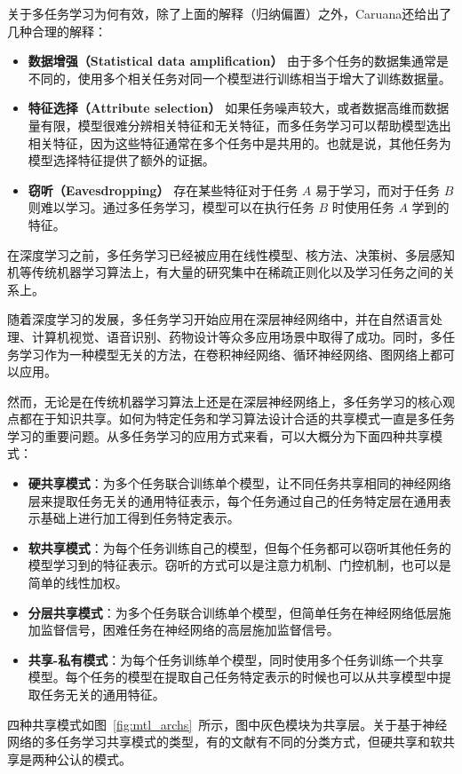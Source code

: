 关于多任务学习为何有效，除了上面的解释（归纳偏置）之外，Caruana还给出了几种合理的解释\cite{Caruana1997}：

\begin{itemize}
	\item \textbf{数据增强（Statistical data amplification）} 由于多个任务的数据集通常是不同的，使用多个相关任务对同一个模型进行训练相当于增大了训练数据量。
	\item \textbf{特征选择（Attribute selection）} 如果任务噪声较大，或者数据高维而数据量有限，模型很难分辨相关特征和无关特征，而多任务学习可以帮助模型选出相关特征，因为这些特征通常在多个任务中是共用的。也就是说，其他任务为模型选择特征提供了额外的证据。
	\item \textbf{窃听（Eavesdropping）} 存在某些特征对于任务 $A$ 易于学习，而对于任务 $B$ 则难以学习。通过多任务学习，模型可以在执行任务 $B$ 时使用任务 $A$ 学到的特征。
\end{itemize}

在深度学习之前，多任务学习已经被应用在线性模型、核方法、决策树、多层感知机等传统机器学习算法上，有大量的研究集中在稀疏正则化\cite{DBLP:conf/nips/ArgyriouEP06}\cite{DBLP:conf/colt/LouniciPTG09}以及学习任务之间的关系\cite{DBLP:journals/jmlr/EvgeniouMP05}\cite{DBLP:conf/nips/JacobBV08}上。

随着深度学习的发展，多任务学习开始应用在深层神经网络中，并在自然语言处理\cite{DBLP:conf/icml/CollobertW08}、计算机视觉\cite{DBLP:conf/cvpr/MisraSGH16}、语音识别\cite{DBLP:conf/icassp/DengHK13}、药物设计\cite{DBLP:journals/corr/RamsundarKRWKP15}等众多应用场景中取得了成功。同时，多任务学习作为一种模型无关的方法，在卷积神经网络\cite{DBLP:conf/icml/CollobertW08}\cite{DBLP:conf/cvpr/MisraSGH16}、循环神经网络\cite{DBLP:conf/ijcai/LiuQH16}、图网络\cite{liu2018multi}上都可以应用。

然而，无论是在传统机器学习算法上还是在深层神经网络上，多任务学习的核心观点都在于知识共享。如何为特定任务和学习算法设计合适的共享模式一直是多任务学习的重要问题。从多任务学习的应用方式来看，可以大概分为下面四种共享模式：

\begin{itemize}
	\item \textbf{硬共享模式}：为多个任务联合训练单个模型，让不同任务共享相同的神经网络层来提取任务无关的通用特征表示，每个任务通过自己的任务特定层在通用表示基础上进行加工得到任务特定表示。
	\item \textbf{软共享模式}：为每个任务训练自己的模型，但每个任务都可以窃听其他任务的模型学习到的特征表示。窃听的方式可以是注意力机制、门控机制，也可以是简单的线性加权。
	\item \textbf{分层共享模式}：为多个任务联合训练单个模型，但简单任务在神经网络低层施加监督信号，困难任务在神经网络的高层施加监督信号。
	\item \textbf{共享-私有模式}：为每个任务训练单个模型，同时使用多个任务训练一个共享模型。每个任务的模型在提取自己任务特定表示的时候也可以从共享模型中提取任务无关的通用特征。
\end{itemize}
四种共享模式如图~\ref{fig:mtl_archs}~所示，图中灰色模块为共享层。关于基于神经网络的多任务学习共享模式的类型，有的文献\cite{ruder2017overview}\cite{DBLP:conf/iclr/MeyersonM18}有不同的分类方式，但硬共享和软共享是两种公认的模式。

